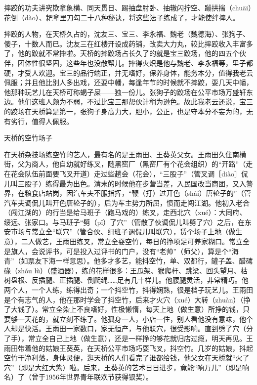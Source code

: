 \documentclass[12pt,UTF8]{ctexbook}
\begin{document}
摔跤的功夫讲究欺拿象横、同天贯日、踢抽盘肘卧、抽辙闪拧空、蹦拱揣（chuāi）花倒（dào）、耙拿里刀勾二十八种秘诀，将这些法子练成了，才能使绊摔人。



摔跤的人物，在天桥久占的，沈友三、宝三、李永福、魏老（魏德海）、张狗子、傻子，十数人而已。沈友三在红楼开设成药铺，改卖大力丸，较比摔跤收入丰富多了，他的跤就不常摔啦。天桥的摔跤场占长久了的就是宝三跤场，他的四五个伙伴，团体性很坚固，这些年也没散帮儿。摔得火炽是他与魏老、李永福等，里子都硬，才受人欢迎。宝三的品行端正，并无嗜好，保养身体，能务本分，值得我老云佩服；并且他比别人多出戏，还耍中幡，每逢年节的时候就不摔跤，耍几天中幡，他那种玩艺儿在天桥可称蝎子屎——独一份儿。张狗子的跤场在公平市场万盛轩东边。他们这班人颇为不弱，不过比宝三那帮伙计稍为逊色。故此我老云还说，宝三的跤场在天桥算是第一，张狗子身高力大，胆小，公正，也是守本分不妄为的，无有劣行，值得人佩服。





天桥的空竹场子


在天桥杂技场练空竹的艺人，最有名的是王雨田、王葵英父女。王雨田久住南横街，父为商人，他自幼就好练叉，随黑窑厂（黑窑厂有个花会组织）的“开路”（走在花会队伍前面要飞叉开道）走过些趟会（花会），“三股子”（管叉调［diào］侃儿叫三股子）练得最为出色。清末的时候他在步营当差，入民国改当商团，又入警界，在粮食店站岗，因汽车夫不服指挥，“鞭（打）过开色（shǎi）唐轮子的”（管汽车夫调侃儿叫开色唐轮子的），后为车主势力所屈，愤而走闯江湖。他初入老合（闯江湖的）的行当是给马班子（跑马戏的）练叉，走西北穴（xué）：大同府、绥远、张家口。与马班子“劈（pǐ）了穴”（管散了伙调侃儿叫劈了穴）之后，在东安市场与常立全“联穴”（管合伙、组班子调侃儿叫联穴），赁个场子上地（做生意），二人做艺，王雨田练叉，常立全耍空竹，每日的挣项足可养家糊口。常立全是旗人，会说评书，可是投入过评书的门户，没有“老帅”（师父），算是个“海青”（如票友下海一样意思）。他多才多艺，能抖空竹，单、双都行，罐子盖、醋碡碌（zhóu lù）（盛酒器），练的花样很多：王瓜架、猴爬杆、跳梁、回头望月、枯树盘根、反插腿、正插腿、倒爬绳……足有几十样儿。他腰腿灵活，非常精巧。他两个人，一个人练，练得出奇；一个抖空竹，抖得娴熟，很是档子玩艺儿。王雨田是个有志气的人，他在那时学会了抖空竹，后来才火穴（xué）大转（zhuàn）（挣了大钱了）。常立全染上不良嗜好，性极懒惰，每天上地（做生意）所挣的钱，只要够一天花的，就立刻不练了。他孤身一人，小店一住，别人看他没有意味，他个人却是快活。王雨田一家数口，家无恒产，与他联穴，很受影响。直到劈了穴（分了手），常立全自己上地（做生意），还是一样挣的够花就归店过瘾，明天再见。王雨田带着他的姑娘王葵英，在天桥公平市场巧耍飞叉，抖空竹。几岁的姑娘，抖起空竹干净利落，身体灵便，逛天桥的人们看完了谁都给钱，他父女在天桥就“火了穴”（即是大红大紫）啦。后来，王葵英的艺术日日进步，竟能“响万儿”（即是响名）了（曾于1956年世界青年联欢节获得银奖）。
\end{document}
